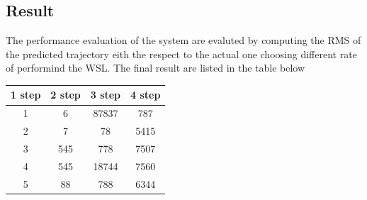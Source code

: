 \documentclass{article}
\begin{document}
\begin{multicols}{2}
    
    \section*{Result}
    The performance evaluation of the system are evaluted by computing the RMS of the predicted trajectory eith the respect to the actual one 
    choosing different rate of performind the WSL. The final result are listed in the table below
    

\begin{center}
    \begin{tabular}{||c c c c||} 
    \hline
    1 step & 2 step & 3 step & 4 step \\ [0.5ex] 
    \hline\hline
    1 & 6 & 87837 & 787 \\ 
    \hline
    2 & 7 & 78 & 5415 \\
    \hline
    3 & 545 & 778 & 7507 \\
    \hline
    4 & 545 & 18744 & 7560 \\
    \hline
    5 & 88 & 788 & 6344 \\ [1ex] 
    \hline
   \end{tabular}
   \end{center}
   
   
    \subsection*{}
\end{multicols}
\end{document}
